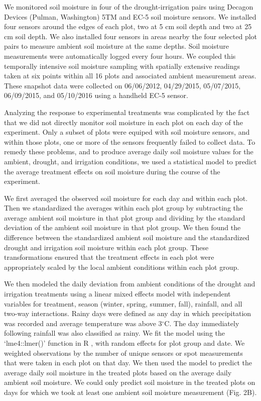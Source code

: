 \documentclass[fleqn,10pt,lineno]{wlpeerj} %
\begin{document}
We monitored soil moisture in four of the drought-irrigation pairs using
Decagon Devices (Pulman, Washington) 5TM and EC-5 soil moisture sensors.
We installed four sensors around the edges of each plot, two at 5 cm
soil depth and two at 25 cm soil depth. We also installed four sensors
in areas nearby the four selected plot pairs to measure ambient soil
moisture at the same depths. Soil moisture measurements were
automatically logged every four hours. We coupled this temporally
intensive soil moisture sampling with spatially extensive readings taken
at six points within all 16 plots and associated ambient measurement
areas. These snapshot data were collected on 06/06/2012, 04/29/2015,
05/07/2015, 06/09/2015, and 05/10/2016 using a handheld EC-5 sensor.

Analyzing the response to experimental treatments was complicated by the
fact that we did not directly monitor soil moisture in each plot on each
day of the experiment. Only a subset of plots were equiped with soil
moisture sensors, and within those plots, one or more of the sensors
frequently failed to collect data. To remedy these problems, and to
produce average daily soil moisture values for the ambient, drought, and
irrigation conditions, we used a statistical model to predict the
average treatment effects on soil moisture during the course of the
experiment.

We first averaged the observed soil moisture for each day and within
each plot. Then we standardized the averages within each plot group by
subtracting the average ambient soil moisture in that plot group and
dividing by the standard deviation of the ambient soil moisture in that
plot group. We then found the difference between the standardized
ambient soil moisture and the standardized drought and irrigation soil
moisture within each plot group. These transformations ensured that the
treatment effects in each plot were appropriately scaled by the local
ambient conditions within each plot group.

We then modeled the daily deviation from ambient conditions of the
drought and irrigation treatments using a linear mixed effects model
with independent variables for treatment, season (winter, spring,
summer, fall), rainfall, and all two-way interactions. Rainy days were
defined as any day in which precipitation was recorded and average
temperature was above 3\(^{\circ}\)C. The day immediately following
rainfall was also classified as rainy. We fit the model using the
`lme4::lmer()' function \citep{Bates2015} in R \citep{R2016}, with
random effects for plot group and date. We weighted observations by the
number of unique sensors or spot measurements that were taken in each
plot on that day. We then used the model to predict the average daily
soil moisture in the treated plots based on the average daily ambient
soil moisture. We could only predict soil moisture in the treated plots
on days for which we took at least one ambient soil moisture measurement
(Fig. 2B).
\end{document}
